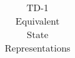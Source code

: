\begin{table}[htbp!]
\begin{tabular}{|p{1.0 in} |p{5.0 in} |}
         \hline
\end{tabular}
   \label{Table: TD-1}
   \caption{TD-1 Equivalent State Representations}
\end{table} 